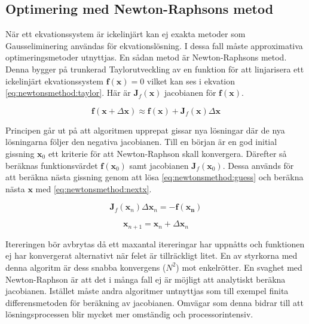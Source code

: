\subsection{Optimering med Newton-Raphsons metod}

När ett ekvationssystem är ickelinjärt kan ej exakta metoder som Gausseliminering användas
för ekvationslösning.
I dessa fall måste approximativa optimeringsmetoder utnyttjas. En sådan
metod är Newton-Raphsons metod. Denna bygger på trunkerad Taylorutveckling 
av en funktion för att linjarisera ett ickelinjärt ekvationssystem
$\mathbf{f}(\mathbf{x}) = 0$
vilket kan ses i ekvation \eqref{eq:newtonsmethod:taylor}. Här är
$\mathbf{J}_f(\mathbf{x})$ jacobianen för $\mathbf{f}(\mathbf{x})$. 

\begin{equation}
\label{eq:newtonsmethod:taylor}
\mathbf{f}(\mathbf{x} + \Delta\mathbf{x}) \approx \mathbf{f}(\mathbf{x}) +
\mathbf{J}_f(\mathbf{x})\Delta\mathbf{x}
\end{equation}

\noindent
Principen går ut på att algoritmen upprepat gissar nya lösningar där de
nya lösningarna följer den negativa jacobianen. Till en början är en god initial gissning
$\mathbf{x}_0$ ett kriterie för att Newton-Raphson skall konvergera. Därefter så beräknas
funktionsvärdet $\mathbf{f}(\mathbf{x}_0)$ samt jacobianen $\mathbf{J}_f(\mathbf{x}_0)$.
Dessa används för att beräkna nästa gissning genom att lösa
\eqref{eq:newtonsmethod:guess} och beräkna nästa $\mathbf{x}$ med
\eqref{eq:newtonsmethod:nextx}. \cite{heath2002}

\begin{equation}
\label{eq:newtonsmethod:guess}
\mathbf{J}_f(\mathbf{x}_n)\Delta\mathbf{x}_n = -\mathbf{f}(\mathbf{x_n})
\end{equation}

\begin{equation}
\label{eq:newtonsmethod:nextx}
\mathbf{x}_{n+1} = \mathbf{x}_n + \Delta\mathbf{x}_n
\end{equation}

\noindent
Itereringen bör avbrytas då ett maxantal itereringar har uppnåtts och funktionen
ej har konvergerat alternativt när felet är tillräckligt litet. En av styrkorna 
med denna algoritm är dess snabba konvergens ($N^2$) mot enkelrötter. \cite{ympa95}
En svaghet med Newton-Raphson är att det i många fall ej är möjligt att analytiskt beräkna
jacobianen. Istället måste andra algoritmer untnyttjas som till exempel finita differensmetoden
för beräkning av jacobianen. Omvägar som denna bidrar till att lösningsprocessen blir mycket
mer omständig och processorintensiv. 
